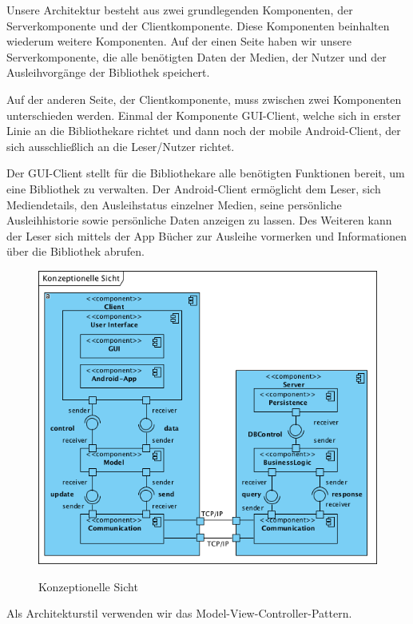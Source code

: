 \documentclass[fontsize=12pt,paper=a4,twoside]{scrartcl}
\begin{document}
Unsere Architektur besteht aus zwei grundlegenden Komponenten, der Serverkomponente und der Clientkomponente. Diese Komponenten beinhalten wiederum weitere Komponenten. Auf der einen Seite haben wir unsere Serverkomponente, die alle benötigten Daten der Medien, der Nutzer und der Ausleihvorgänge der Bibliothek speichert.

Auf der anderen Seite, der Clientkomponente, muss zwischen zwei Komponenten unterschieden werden. Einmal der Komponente GUI-Client, welche sich in erster Linie an die Bibliothekare richtet und dann noch der mobile Android-Client, der sich ausschließlich an die Leser/Nutzer richtet.

Der GUI-Client stellt für die Bibliothekare alle benötigten Funktionen bereit, um eine Bibliothek zu verwalten. Der Android-Client ermöglicht dem Leser, sich Mediendetails, den Ausleihstatus einzelner Medien, seine persönliche Ausleihhistorie sowie persönliche Daten anzeigen zu lassen. Des Weiteren kann der Leser sich mittels der App Bücher zur Ausleihe vormerken und Informationen über die Bibliothek abrufen.

\begin{figure} [H] 
\caption{Konzeptionelle Sicht}  \centering
	\includegraphics[width=1\textwidth]{Diagramme/KonzeptionelleSicht.png} 
	\label{pic:konzeptionellesicht} 
\end{figure}

{\centering Als Architekturstil verwenden wir das Model-View-Controller-Pattern.\\}
\end{document}
